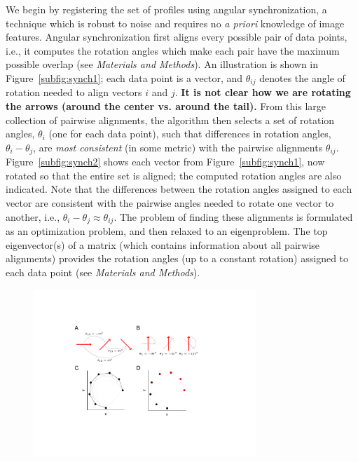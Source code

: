 \documentclass{pnastwo}
\begin{document}
\begin{article}
We begin by registering the set of profiles using angular synchronization\cite{singer2011angular}, a technique which is robust to noise and requires no {\em a priori} knowledge of image features.
%
Angular synchronization first aligns every possible pair of data points, i.e., it computes the rotation angles
which make each pair have the maximum possible overlap (see {\it Materials and Methods}).
%
An illustration is shown in Figure~\ref{subfig:synch1};
each data point is a vector, and $\theta_{ij}$ denotes the angle of rotation needed to align vectors $i$ and $j$.
%
{\bf It is not clear how we are rotating the arrows (around the center vs. around the tail).}
%
From this large collection of pairwise alignments, the algorithm then selects a set of rotation angles, $\theta_i$ (one for each data point), such that differences in rotation angles, $\theta_i-\theta_j$, are {\em most consistent} (in some metric) with the pairwise alignments $\theta_{ij}$.
%
Figure~\ref{subfig:synch2} shows each vector from Figure~\ref{subfig:synch1}, now rotated so that the entire set is aligned; the computed rotation angles are also indicated.
%
Note that the differences between the rotation angles assigned to each vector are consistent with the pairwise angles needed to rotate one vector to another, i.e., $\theta_i - \theta_j \approx \theta_{ij}$.
%
The problem of finding these alignments is formulated as an optimization problem, and then relaxed to an eigenproblem.
%
The top eigenvector(s) of a matrix (which contains information about all pairwise alignments)
provides the rotation angles (up to a constant rotation) assigned to each data point (see {\it Materials and Methods}).
%
%
\begin{figure}[t]
\includegraphics[width=8.4cm]{fig4}

\end{figure}
\end{article}
\end{document}
